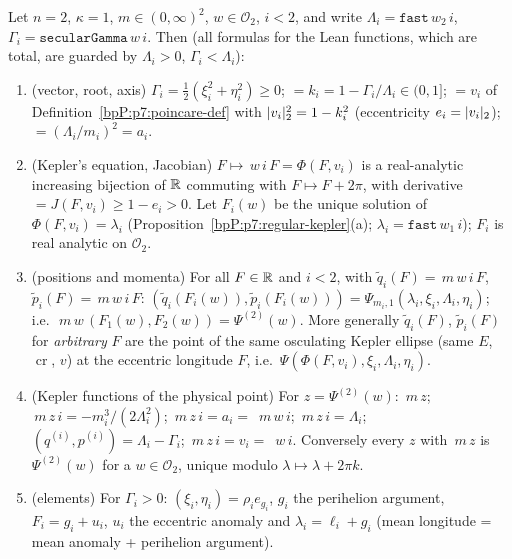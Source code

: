 \begin{proposition}[D25 definitions = the chart in the eccentric longitude]\label{bpP:p7:d25}\label{bpP:p7:eccentric-longitude}
Let $n=2$, $\kappa=1$, $m\in(0,\infty)^2$, $w\in\mathcal O_2$, $i<2$, and write $\Lambda_i=\texttt{fast}\,w_2\,i$, $\Gamma_i=\texttt{secularGamma}\,w\,i$. Then (all formulas for the Lean functions, which are total, are guarded by $\Lambda_i>0$, $\Gamma_i<\Lambda_i$):
\begin{enumerate}[label=(\alph*)]
\item \textup{(vector, root, axis)} $\Gamma_i=\tfrac12(\xi_i^2+\eta_i^2)\ge0$; ${}=k_i=1-\Gamma_i/\Lambda_i\in(0,1]$; ${}=v_i$ of Definition~\ref{bpP:p7:poincare-def} with $\lvert v_i\rvert_2^2=1-k_i^2$ (eccentricity $e_i=\lvert v_i\rvert_2$); ${}=(\Lambda_i/m_i)^2=a_i$.
\item \textup{(Kepler's equation, Jacobian)} $F\mapsto$$\,w\,i\,F=\Phi(F,v_i)$ is a real-analytic increasing bijection of $\mathbb{R}$ commuting with $F\mapsto F+2\pi$, with derivative ${}=J(F,v_i)\ge1-e_i>0$. Let $F_i(w)$ be the unique solution of $\Phi(F,v_i)=\lambda_i$ (Proposition~\ref{bpP:p7:regular-kepler}(a); $\lambda_i=\texttt{fast}\,w_1\,i$); $F_i$ is real analytic on $\mathcal O_2$.
\item \textup{(positions and momenta)} For all $F\in\mathbb{R}$ and $i<2$, with $\tilde q_i(F)=$$\,m\,w\,i\,F$, $\tilde p_i(F)=$$\,m\,w\,i\,F$:
$(\tilde q_i(F_i(w)),\tilde p_i(F_i(w)))=\Psi_{m_i,1}(\lambda_i,\xi_i,\Lambda_i,\eta_i)$; i.e.\ $\,m\,w\,(F_1(w),F_2(w))=\Psi^{(2)}(w)$.
More generally $\tilde q_i(F)$, $\tilde p_i(F)$ for \emph{arbitrary} $F$ are the point of the same osculating Kepler ellipse (same $E$, $\operatorname{cr}$, $v$) at the eccentric longitude $F$, i.e.\ $\Psi(\Phi(F,v_i),\xi_i,\Lambda_i,\eta_i)$.
\item \textup{(Kepler functions of the physical point)} For $z=\Psi^{(2)}(w)$: $\,m\,z$; $\,m\,z\,i=-m_i^3/(2\Lambda_i^2)$; $\,m\,z\,i=a_i=$ $\,m\,w\,i$; $\,m\,z\,i=\Lambda_i$; $(q^{(i)},p^{(i)})=\Lambda_i-\Gamma_i$; $\,m\,z\,i=v_i=$ $\,w\,i$. Conversely every $z$ with $\,m\,z$ is $\Psi^{(2)}(w)$ for a $w\in\mathcal O_2$, unique modulo $\lambda\mapsto\lambda+2\pi k$.
\item \textup{(elements)} For $\Gamma_i>0$: $(\xi_i,\eta_i)=\rho_ie_{g_i}$, $g_i$ the perihelion argument, $F_i=g_i+u_i$, $u_i$ the eccentric anomaly and $\lambda_i=\ell_i+g_i$ (mean longitude = mean anomaly + perihelion argument).
\end{enumerate}
\end{proposition}
